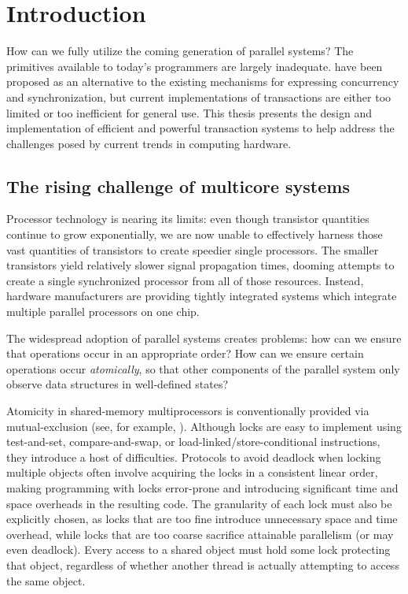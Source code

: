 \chapter{Introduction}\label{cha:intro}

How can we fully utilize the coming generation of parallel systems?
The primitives available to today's programmers are largely
inadequate.   have been proposed as an
alternative to the existing mechanisms for expressing concurrency and
synchronization, but current implementations of transactions are
either too limited or too 
inefficient for general use.  This thesis presents the design
and implementation of efficient and powerful transaction systems to
help address the challenges posed by current trends in computing
hardware.

\section{The rising challenge of multicore systems}
Processor technology is nearing its limits: even
though transistor quantities continue to grow exponentially, we are
now unable to effectively harness those vast quantities of transistors
to create speedier single processors.  The smaller transistors yield
relatively slower signal propagation times, dooming attempts to create
a single synchronized processor from all of those resources.
Instead, hardware manufacturers are providing tightly integrated
 systems which integrate multiple parallel
processors on one chip.

The widespread adoption of parallel systems creates problems: how can
we ensure that operations occur in an appropriate order?
How can we ensure certain operations occur
\textit{atomically}, so that other components of the parallel system
only observe data structures in well-defined states?

Atomicity in shared-memory multiprocessors is 
conventionally provided
via mutual-exclusion  (see, for example,
\cite[p.~35]{Tanenbaum92}).  Although locks are easy to
implement using test-and-set, compare-and-swap, or
load-linked/{\bp}store-conditional instructions, they introduce a host of
difficulties.  Protocols to avoid deadlock when locking multiple
objects often involve acquiring the locks in a consistent linear
order, making programming with locks error-prone and introducing
significant time and space overheads in the resulting code.  The
granularity of each lock must also be
explicitly chosen, as locks that are too fine introduce unnecessary
space and time overhead, while locks that are too coarse sacrifice
attainable parallelism (or may even deadlock).  Every access to a
shared object must hold some lock protecting that object, regardless
of whether another thread is actually attempting to access the same object.


